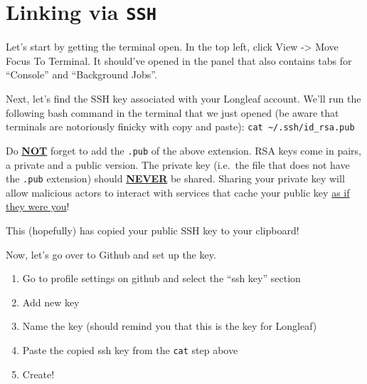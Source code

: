 \documentclass[
  letterpaper,
  DIV=11,
  numbers=noendperiod]{scrreprt}
\begin{document}
\section{\texorpdfstring{Linking via
\texttt{SSH}}{Linking via SSH}}\label{linking-via-ssh}

Let's start by getting the terminal open. In the top left, click View
-\textgreater{} Move Focus To Terminal. It should've opened in the panel
that also contains tabs for ``Console'' and ``Background Jobs''.

Next, let's find the SSH key associated with your Longleaf account.
We'll run the following bash command in the terminal that we just opened
(be aware that terminals are notoriously finicky with copy and paste):
\texttt{cat\ \textasciitilde{}/.ssh/id\_rsa.pub}

\begin{tcolorbox}[enhanced jigsaw, bottomtitle=1mm, bottomrule=.15mm, toprule=.15mm, opacityback=0, leftrule=.75mm, breakable, colback=white, toptitle=1mm, left=2mm, coltitle=black, titlerule=0mm, opacitybacktitle=0.6, title=\textcolor{quarto-callout-caution-color}{\faFire}\hspace{0.5em}{Caution}, rightrule=.15mm, arc=.35mm, colframe=quarto-callout-caution-color-frame, colbacktitle=quarto-callout-caution-color!10!white]

Do \ul{\textbf{NOT}} forget to add the \texttt{.pub} of the above
extension. RSA keys come in pairs, a private and a public version. The
private key (i.e.~the file that does not have the \texttt{.pub}
extension) should \ul{\textbf{NEVER}} be shared. Sharing your private
key will allow malicious actors to interact with services that cache
your public key \ul{as if they were you}!

\end{tcolorbox}

This (hopefully) has copied your public SSH key to your clipboard!

Now, let's go over to Github and set up the key.

\begin{enumerate}
\def\labelenumi{\arabic{enumi}.}
\item
  Go to profile settings on github and select the ``ssh key'' section
\item
  Add new key
\item
  Name the key (should remind you that this is the key for Longleaf)
\item
  Paste the copied ssh key from the \texttt{cat} step above
\item
  Create!
\end{enumerate}
\end{document}
